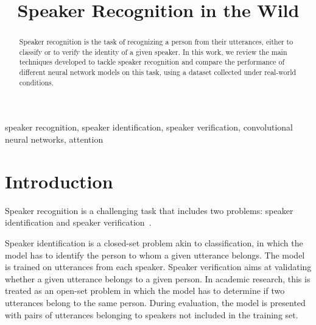 \documentclass[conference]{IEEEtran}
\begin{document}
\title{Speaker Recognition in the Wild\\}

\author{
}

\maketitle

\begin{abstract}
Speaker recognition is the task of recognizing a person from their utterances, either to classify or to verify the identity of a given speaker. In this work, we review the main techniques developed to tackle speaker recognition and compare the performance of different neural network models on this task, using a dataset collected under real-world conditions.  
\end{abstract}

\begin{IEEEkeywords}
speaker recognition, speaker identification, speaker verification, convolutional neural networks, attention
\end{IEEEkeywords}

\section{Introduction}

Speaker recognition is a challenging task that includes two problems: speaker identification and speaker verification~\cite{kabir2021survey,hajibabaei2018unified,chung2020defence}. 

Speaker identification is a closed-set problem akin to classification, in which the model has to identify the person to whom a given utterance belongs. The model is trained on utterances from each speaker. Speaker verification aims at validating whether a given utterance belongs to a given person. In academic research, this is treated as an open-set problem in which the model has to determine if two utterances belong to the same person. During evaluation, the model is presented with pairs of utterances belonging to speakers not included in the training set.

\end{document}

